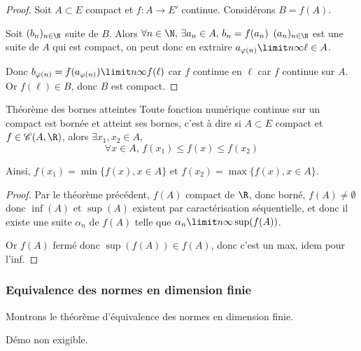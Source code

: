 
\begin{proof}
    Soit $A \subset E$ compact et $f : A \to E'$ continue. Considérons $B = f(A)$. 

    Soit $(b_n)_{n \in \N}$ suite de $B$. Alors $\forall n \in \N, \, \exists a_n \in A, \, b_n = f(a_n)$
    $(a_n)_{n \in \N}$ est une suite de $A$ qui est compact, on peut donc en extraire 
    $a_{\varphi(n)} \limit n \infty \ell \in A$. 

    Donc $b_{\varphi(n)} = f(a_{\varphi(n)}) \limit n \infty f(\ell) $ car $f$ continue en 
    $\ell$ car $f$ continue sur $A$. Or $f(\ell) \in B$, donc $B$ est compact.
\end{proof}

\begin{theoreme}{Théorème des bornes atteintes}{}
    Toute fonction numérique continue sur un compact est bornée et atteint ses bornes, c'est à dire 
    si $A \subset E$ compact et $f \in \mathscr C(A, \R)$, alors 
    $\exists x_1, x_2 \in A$,  $$\forall x \in A, \, f(x_1) \leqslant f(x) \leqslant f(x_2)$$

    Ainsi, $f(x_1) = \min \{ f(x), x \in A \}$ et $f(x_2) = \max \{ f(x), x \in A \}$.
\end{theoreme}


\begin{proof}
    Par le théorème précédent, $f(A)$ compact de $\R$, donc borné, $f(A) \neq \emptyset$ donc 
    $ \inf(A)$ et $\sup(A)$ existent par caractérisation séquentielle, et donc il existe une suite 
    $\alpha_n$ de $f(A)$ telle que $\alpha_n \limit n \infty \sup(f(A))$.

    Or $f(A)$ fermé donc $\sup(f(A)) \in f(A)$, donc c'est un max, idem pour l'inf. 
\end{proof}

\subsubsection{Equivalence des normes en dimension finie}

Montrons le théorème d'équivalence des normes en dimension finie.

Démo non exigible.



